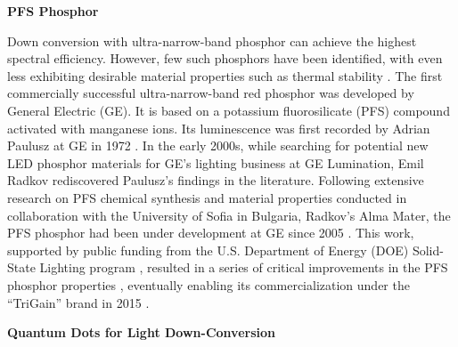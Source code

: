 \documentclass[parskip=full]{article}
\begin{document}
\textbf{PFS Phosphor}

Down conversion with ultra-narrow-band phosphor can achieve the highest spectral efficiency. However, few such phosphors have been identified, with even less exhibiting desirable material properties such as thermal stability \cite{Phillips2007}. The first commercially successful ultra-narrow-band red phosphor was developed by General Electric (GE). It is based on a potassium fluorosilicate (PFS) compound activated with manganese ions. Its luminescence was first recorded by Adrian Paulusz at GE in 1972 \cite{paulusz1973efficient}. In the early 2000s, while searching for potential new LED phosphor materials for GE’s lighting business at GE Lumination, Emil Radkov rediscovered Paulusz’s findings in the literature. Following extensive research on PFS chemical synthesis and material properties conducted in collaboration with the University of Sofia in Bulgaria, Radkov’s Alma Mater, the PFS phosphor had been under development at GE since 2005 \cite{radkov2006red}\cite{radkov2009red}. This work, supported by public funding from the U.S. Department of Energy (DOE) Solid-State Lighting program \cite{doesslprogram}, resulted in a series of critical improvements in the PFS phosphor properties \cite{Setlur2010}\cite{lyons2012color}, eventually enabling its commercialization under the “TriGain” brand in 2015 \cite{trigain_spectrum}\cite{setlur2015trigain}\cite{Murphy2015}.

\textbf{Quantum Dots for Light Down-Conversion}
\end{document}
